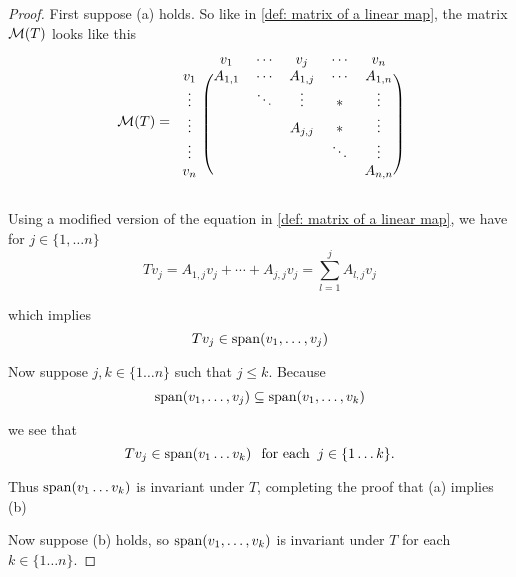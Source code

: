 \begin{proof}
  First suppose (a) holds. So like in \ref{def: matrix of a linear map}, the matrix $\mathcal{M}(T)$ looks like this
  \begin{equation}
    \mathcal{M} (T) =
    \begin{blockarray}{cccccc}
      & v_1     & \cdots & v_j      & \cdots & v_n     \\
      \begin{block}{c(ccccc)}
        v_1    & A_{1,1} & \cdots & A_{1,j}  & \cdots & A_{1,n} \\
        \vdots &         & \ddots & \vdots   &   *    & \vdots  \\
        \vdots &         &        & A_{j,j}  &   *    & \vdots  \\
        \vdots &         &        &          & \ddots & \vdots  \\
        v_n    &         &        &          &        & A_{n,n} \\
      \end{block}
    \end{blockarray}
  \end{equation}
  
  Using a modified version of the equation in \ref{def: matrix of a linear map}, we have for $j\in \{1, \ldots n \}$
  \begin{equation}
    T v_j = A_{1,j} v_j + \cdots + A_{j,j} v_j = \sum_{l=1}^{j} A_{l,j} v_j
  \end{equation}
  
  which implies
  \begin{equation}
    T v_j \in \operatorname{span} (v_1, \ldots, v_j)
  \end{equation}
  
  Now suppose $j, k \in \{1 \ldots n \}$ such that $j \leq  k.$ Because
  \begin{equation}
    \operatorname{span} (v_1, \ldots, v_j) \subseteq \operatorname{span} (v_1, \ldots, v_k)
  \end{equation} 
  
  we see that
  \begin{equation}
    T v_j \in \operatorname{span} (v_1 \ldots v_k) \;\;\, \text{for each}\;\; j \in \{1 \ldots k\}.
  \end{equation}
  
  Thus $\operatorname{span} (v_1 \ldots v_k)$ is invariant under $T$, completing the proof that (a) implies (b)
  
  Now suppose (b) holds, so $\operatorname{span} (v_1, \ldots, v_k)$ is invariant under $T$ for each $k \in \{1 \ldots n\}.$ 
  

\end{proof}

